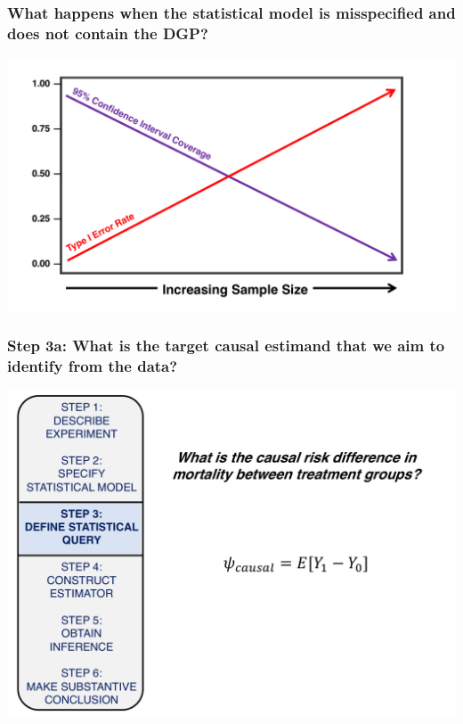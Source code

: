 \documentclass[t]{beamer}
\begin{document}
\begin{frame}
\frametitle{What happens when the statistical model is misspecified and does not contain the DGP?}
\vspace{15pt}
\centering
\includegraphics[width=1.05\textwidth]{figures/misspecified.pdf}
\end{frame}

\begin{frame}
  \frametitle{Step 3a: What is the target causal estimand that we aim to identify from the data?}
  \vspace{-20pt}
  \begin{center}
  \includegraphics[width = 1.05\textwidth]{figures/roadmap3_1.pdf}
  \end{center}
\end{frame}
\end{document}

